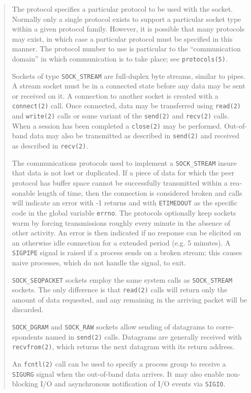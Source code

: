 \begin{appendix}
\begin{english}
\begin{quote}
	The protocol specifies a particular protocol to be used with
	the socket. Normally only a single protocol exists to support a
	particular socket type within a given protocol family. However,
	it is possible that many protocols may exist, in which case a
	particular protocol must be specified in this manner. The protocol
	number to use is particular to the ``communication domain'' in
	which communication is to take place; see {\tt protocols(5)}.

	Sockets of type {\tt SOCK\_STREAM} are full-duplex byte streams, similar 
	to pipes. A stream socket must be in a connected state before any
	data may be sent or received on it. A connection to another
	socket is created with a {\tt connect(2)} call. Once connected, data 
	may be transferred using {\tt read(2)} and {\tt write(2)} calls or some
	variant of the {\tt send(2)} and {\tt recv(2)} calls. When a session has been 
	completed a {\tt close(2)} may be performed. Out-of-band data may also
	be transmitted as described in {\tt send(2)} and received as
	described in {\tt recv(2)}.

	The communications protocols used to implement a
	{\tt SOCK\_STREAM} insure that data is not lost or duplicated. If a
	piece of data for which the peer protocol has buffer space cannot be
	successfully transmitted within a reasonable length of time, 
	then the connection is considered broken and calls will indicate an
	error with -1 returns and with {\tt ETIMEDOUT} as the specific
	code in the global variable {\tt errno}. The protocols optionally keep
	sockets warm by forcing transmissions roughly every minute in the
	absence of other activity. An error is then indicated if no 
	response can be elicited on an otherwise idle connection for a
	extended period (e.g. 5 minutes). A {\tt SIGPIPE} signal is raised 
	if a process sends on a broken stream; this causes naive processes,
	which do not handle the signal, to exit.

	{\tt SOCK\_SEQPACKET} sockets employ the same system calls as
	{\tt SOCK\_STREAM} sockets. The only difference is that {\tt read(2)} calls 
	will return only the amount of data requested, and any remaining in
	the arriving packet will be discarded.

	{\tt SOCK\_DGRAM} and {\tt SOCK\_RAW} sockets allow sending of datagrams to 
	correspondents named in {\tt send(2)} calls. Datagrams are generally
	received with {\tt recvfrom(2)}, which returns the next datagram with
	its return address.

	An {\tt fcntl(2)} call can be used to specify a process group to receive a
	{\tt SIGURG} signal when the out-of-band data arrives. It may also enable
	non-blocking I/O and asynchronous notification of I/O events via
	{\tt SIGIO}.


\end{quote}
\end{english}
\end{appendix}
